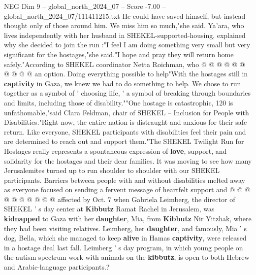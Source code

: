 \begin{textsample}{NEG Dim 9 – global\_north\_2024\_07 – Score -7.00 – global\_north\_2024\_07/111411215.txt}
He could have saved himself, but instead thought only of those around him.
We miss him so much,"she said.
Ya'ara, who lives independently with her husband in SHEKEL-supported-housing, explained why she decided to join the run :"I feel I am doing something very small but very significant for the hostages,"she said."I hope and pray they will return home safely."According to SHEKEL coordinator Netta Roichman, who @ @ @ @ @ @ @ @ @ @ an option.
Doing everything possible to help"With the hostages still in \textbf{captivity} in Gaza, we knew we had to do something to help.
We chose to run together as a symbol of ' choosing life, ' a symbol of breaking through boundaries and limits, including those of disability.""One hostage is catastrophic, 120 is unfathomable,"said Clara Feldman, chair of SHEKEL -- Inclusion for People with Disabilities."Right now, the entire nation is distraught and anxious for their safe return.
Like everyone, SHEKEL participants with disabilities feel their pain and are determined to reach out and support them."The SHEKEL Twilight Run for Hostages really represents a spontaneous expression of \textbf{love}, support, and solidarity for the hostages and their dear families.
It was moving to see how many Jerusalemites turned up to run shoulder to shoulder with our SHEKEL participants.
Barriers between people with and without disabilities melted away as everyone focused on sending a fervent message of heartfelt support and @ @ @ @ @ @ @ @ @ @ affected by Oct. 7 when Gabriela Leimberg, the director of SHEKEL ' s day center at \textbf{Kibbutz} Ramat Rachel in Jerusalem, was \textbf{kidnapped} to Gaza with her \textbf{daughter}, Mia, from \textbf{Kibbutz} Nir Yitzhak, where they had been visiting relatives.
Leimberg, her \textbf{daughter}, and famously, Mia ' s dog, Bella, which she managed to keep \textbf{alive} in Hamas \textbf{captivity}, were released in a hostage deal last fall.
Leimberg ' s day program, in which young people on the autism spectrum work with animals on the \textbf{kibbutz}, is open to both Hebrew- and Arabic-language participants.?

\end{textsample}
